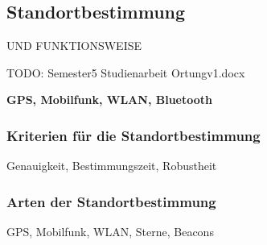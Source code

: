 \subsection{Standortbestimmung}
UND FUNKTIONSWEISE

TODO:
Semester5 Studienarbeit Ortungv1.docx



\textbf{GPS, Mobilfunk, WLAN, Bluetooth}

\subsubsection{Kriterien für die Standortbestimmung}
Genauigkeit, Bestimmungszeit, Robustheit

\subsubsection{Arten der Standortbestimmung}
GPS, Mobilfunk, WLAN, Sterne, Beacons